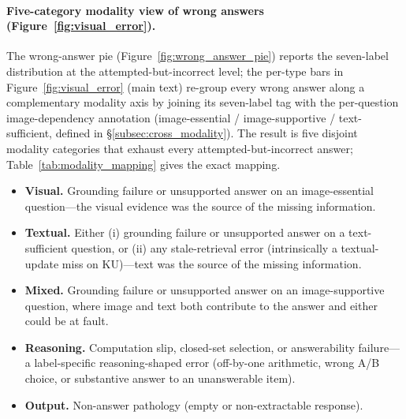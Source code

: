 \documentclass{llmxive}
\begin{document}
\paragraph{Five-category modality view of wrong answers (Figure~\ref{fig:visual_error}).}
The wrong-answer pie (Figure~\ref{fig:wrong_answer_pie}) reports the seven-label distribution at the
attempted-but-incorrect level; the per-type bars in Figure~\ref{fig:visual_error} (main text) re-group every
wrong answer along a complementary modality axis by joining its seven-label tag with the per-question
image-dependency annotation (image-essential / image-supportive / text-sufficient, defined in
\S\ref{subsec:cross_modality}). The result is five disjoint modality categories that exhaust every
attempted-but-incorrect answer; Table~\ref{tab:modality_mapping} gives the exact mapping.
\begin{itemize}[leftmargin=1.2em,topsep=2pt,itemsep=2pt]
\item \textbf{Visual.} Grounding failure or unsupported answer on an image-essential question---the visual evidence was the source of the missing information.
\item \textbf{Textual.} Either (i) grounding failure or unsupported answer on a text-sufficient question, or (ii) any stale-retrieval error (intrinsically a textual-update miss on KU)---text was the source of the missing information.
\item \textbf{Mixed.} Grounding failure or unsupported answer on an image-supportive question, where image and text both contribute to the answer and either could be at fault.
\item \textbf{Reasoning.} Computation slip, closed-set selection, or answerability failure---a label-specific reasoning-shaped error (off-by-one arithmetic, wrong A/B choice, or substantive answer to an unanswerable item).
\item \textbf{Output.} Non-answer pathology (empty or non-extractable response).
\end{itemize}
\end{document}
